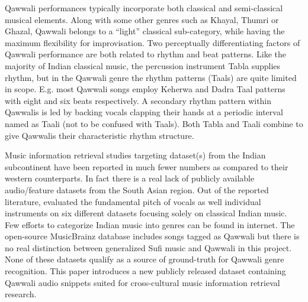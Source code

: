 \documentclass{article}
\begin{document}
Qawwali performances typically incorporate both classical and semi-classical musical elements.
Along with some other genres such as Khayal, Thumri or Ghazal, Qawwali belongs to a “light” classical \citep{qureshi1986sufi} sub-category, while having the maximum flexibility for improvisation. Two perceptually differentiating factors of Qawwali performance are both related to rhythm and beat patterns. Like the majority of Indian classical music, the percussion instrument Tabla supplies rhythm, but in the Qawwali genre the rhythm patterns (Taals) are quite limited in scope. E.g. most Qawwali songs employ Keherwa and Dadra Taal patterns with eight and six beats respectively. A secondary rhythm pattern within Qawwalis is led by backing vocals clapping their hands at a periodic interval named as Taali (not to be confused with Taals). Both Tabla and Taali combine to give Qawwalis their characteristic rhythm structure.

Music information retrieval studies targeting dataset(s) from the Indian subcontinent have been reported in much fewer numbers as compared to their western counterparts. In fact there is a real lack of publicly available audio/feature datasets from the South Asian region. Out of the reported literature, \citep{carnatic_dataset} evaluated the fundamental pitch of vocals as well individual instruments on six different datasets focusing solely on classical Indian music. Few efforts to categorize Indian music into genres can be found in internet. The open-source MusicBrainz database includes songs tagged as Qawwali but there is no real distinction between generalized Sufi music and Qawwali in this project. None of these datasets qualify as a source of ground-truth for Qawwali genre recognition. This paper introduces a new publicly released dataset containing Qawwali audio snippets suited for cross-cultural music information retrieval research.
\end{document}
